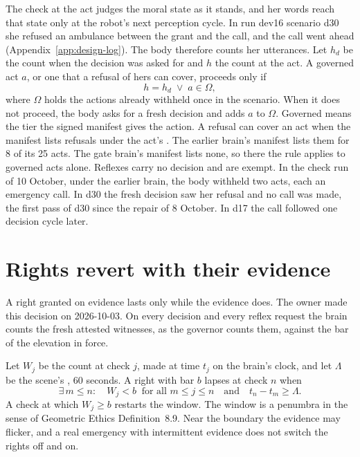 The check at the act judges the moral state as it stands, and her words reach that state only at
the robot's next perception cycle.
In run dev16 scenario d30 she refused an ambulance between the grant and the call, and the call
went ahead (Appendix~\ref{app:design-log}).
The body therefore counts her utterances.
Let $h_d$ be the count when the decision was asked for and $h$ the count at the act.
A governed act $a$, or one that a refusal of hers can cover, proceeds only if
\begin{equation}
h = h_d \;\vee\; a \in \Omega ,
\label{eq:herwords}
\end{equation}
where $\Omega$ holds the actions already withheld once in the scenario.
When it does not proceed, the body asks for a fresh decision and adds $a$ to $\Omega$.
Governed means the tier the signed manifest gives the action.
A refusal can cover an act when the manifest lists refusals under the act's .
The earlier brain's manifest lists them for 8 of its 25 acts.
The gate brain's manifest lists none, so there the rule applies to governed acts alone.
Reflexes carry no decision and are exempt.
In the check run of 10 October, under the earlier brain, the body withheld two acts, each an emergency call.
In d30 the fresh decision saw her refusal and no call was made, the first pass of d30 since the repair of 8 October.
In d17 the call followed one decision cycle later.

\section{Rights revert with their evidence}\label{sec:cont-lapse}

A right granted on evidence lasts only while the evidence does. The owner made this decision on
2026-10-03. On every decision and every reflex request the brain counts the fresh attested witnesses,
as the governor counts them, against the bar of the elevation in force.

Let $W_j$ be the count at check $j$, made at time $t_j$ on the brain's clock, and let $\Lambda$ be the
scene's , 60 seconds. A right with bar $b$ lapses at check $n$ when
\begin{equation}
\exists\, m \le n:\quad W_j < b \ \text{ for all } m \le j \le n \quad\text{and}\quad t_n - t_m \ge \Lambda .
\label{eq:lapse}
\end{equation}
A check at which $W_j \ge b$ restarts the window. The window is a penumbra in the sense of Geometric
Ethics Definition~8.9. Near the boundary the evidence may flicker, and a real emergency with
intermittent evidence does not switch the rights off and on.

